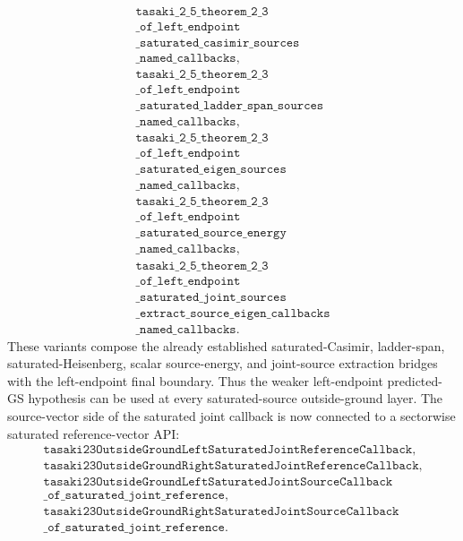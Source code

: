 \documentclass[a4paper,11pt]{article}
\begin{document}
\[
\begin{gathered}
\texttt{tasaki\_2\_5\_theorem\_2\_3}\\
\texttt{\_of\_left\_endpoint}\\
\texttt{\_saturated\_casimir\_sources}\\
\texttt{\_named\_callbacks},\\
\texttt{tasaki\_2\_5\_theorem\_2\_3}\\
\texttt{\_of\_left\_endpoint}\\
\texttt{\_saturated\_ladder\_span\_sources}\\
\texttt{\_named\_callbacks},\\
\texttt{tasaki\_2\_5\_theorem\_2\_3}\\
\texttt{\_of\_left\_endpoint}\\
\texttt{\_saturated\_eigen\_sources}\\
\texttt{\_named\_callbacks},\\
\texttt{tasaki\_2\_5\_theorem\_2\_3}\\
\texttt{\_of\_left\_endpoint}\\
\texttt{\_saturated\_source\_energy}\\
\texttt{\_named\_callbacks},\\
\texttt{tasaki\_2\_5\_theorem\_2\_3}\\
\texttt{\_of\_left\_endpoint}\\
\texttt{\_saturated\_joint\_sources}\\
\texttt{\_extract\_source\_eigen\_callbacks}\\
\texttt{\_named\_callbacks}.
\end{gathered}
\]
These variants compose the already established saturated-Casimir,
ladder-span, saturated-Heisenberg, scalar source-energy, and joint-source
extraction bridges with the left-endpoint final boundary.  Thus the weaker
left-endpoint predicted-GS hypothesis can be used at every saturated-source
outside-ground layer.
The source-vector side of the saturated joint callback is now connected to a
sectorwise saturated reference-vector API:
\[
\begin{gathered}
\texttt{tasaki23OutsideGroundLeftSaturatedJointReferenceCallback},\\
\texttt{tasaki23OutsideGroundRightSaturatedJointReferenceCallback},\\
\texttt{tasaki23OutsideGroundLeftSaturatedJointSourceCallback}\\
\texttt{\_of\_saturated\_joint\_reference},\\
\texttt{tasaki23OutsideGroundRightSaturatedJointSourceCallback}\\
\texttt{\_of\_saturated\_joint\_reference}.
\end{gathered}
\]
\end{document}
